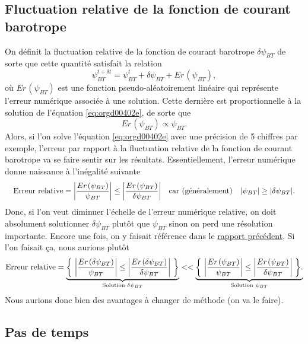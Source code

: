 \documentclass[10pt]{article}
\numberwithin{equation}{section}
\newcommand{\pt}{\hspace{1pt}} %
\begin{document}
\subsection{Fluctuation relative de la fonction de courant barotrope}
\label{sec:org3a1e4c3}
On définit la fluctuation relative de la fonction de courant barotrope \(\delta \psi_{BT}\) de sorte que cette quantité satisfait la relation
\begin{equation}
   \psi_{BT}^{t+\delta t} = \psi_{BT}^t + \delta \psi_{BT} + Er\pt(\psi_{BT}),
\end{equation}
où \(Er\pt(\psi_{BT})\) est une fonction pseudo-aléatoirement linéaire qui représente l'erreur numérique associée à une solution.
Cette dernière est proportionnelle à la solution de l'équation \ref{eq:orgd00402e}, de sorte que
\begin{equation}
    Er\pt(\psi_{BT}) \propto \psi_{BT}.
\end{equation}
Alors, si l'on solve l'équation \ref{eq:orgd00402e} avec une précision de 5 chiffres par exemple, l'erreur par rapport à la fluctuation relative de la fonction de courant barotrope va se faire sentir sur les résultats.
Essentiellement, l'erreur numérique donne naissance à l'inégalité suivante
\begin{align}
   &&\text{Erreur relative} = \abs{\frac{Er\pt(\psi_{BT})}{\psi_{BT}}} \le \abs{ \frac{Er\pt(\psi_{BT})}{\delta \psi_{BT}} } &&\text{car (généralement)} && \abs{\psi_{BT}} \ge \abs{\delta \psi_{BT}}. &&
\end{align}
Donc, si l'on veut diminuer l'échelle de l'erreur numérique relative, on doit absolument solutionner \(\delta \psi_{BT}\) plutôt que \(\psi_{BT}\) sinon on perd une résolution importante.
Encore une fois, on y faisait référence dans le \href{rapport-2023-04-28.org}{rapport précédent}.
Si l'on faisait ça, nous aurions plutôt
\begin{align}
   \text{Erreur relative} = \underbrace{\qty{\ \abs{\frac{Er\pt(\delta\psi_{BT})}{\psi_{BT}}} \le \abs{ \frac{Er\pt(\delta\psi_{BT})}{\delta \psi_{BT}} }\ }}_\text{Solution $\delta \psi_{BT}$}
   <<
   \underbrace{\qty{\ \abs{\frac{Er\pt(\psi_{BT})}{\psi_{BT}}} \le \abs{ \frac{Er\pt(\psi_{BT})}{\delta \psi_{BT}} }\ }.}_\text{Solution $\psi_{BT}$}
\end{align}
Nous aurions donc bien des avantages à changer de méthode (on va le faire).
\subsection{Pas de temps}
\label{sec:orgae3fc03}
\end{document}

